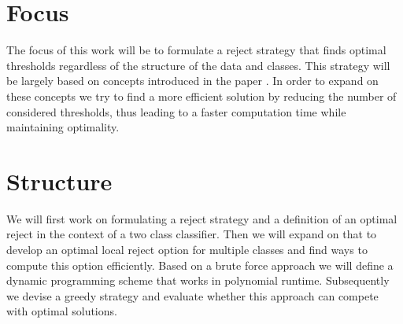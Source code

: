 \section{Focus}
\label{focus}
The focus of this work will be to formulate a reject strategy that finds optimal thresholds regardless of the  structure of the data and classes. This strategy will be largely based on concepts introduced in the paper \cite{Fis:2015}. In order to expand on these concepts we try to find a more efficient solution by reducing the number of considered thresholds, thus leading to a faster computation time while maintaining optimality.

\section{Structure}
We will first work on formulating a reject strategy and a definition of an optimal reject in the context of a two class classifier. Then we will expand on that to develop an optimal local reject option for multiple classes and find ways to compute this option efficiently. Based on a brute force approach we will define a dynamic programming scheme that works in polynomial runtime. Subsequently we devise a greedy strategy and evaluate whether this approach can compete with optimal solutions.